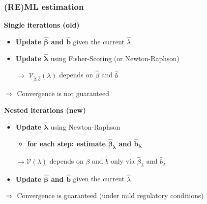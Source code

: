 \documentclass[final]{beamer}
\begin{document}





\begin{frame}
\frametitle{(RE)ML estimation}

\textcolor{beamer@postercolour}{\textbf{Single iterations (old)}}
\begin{itemize}
\item \textbf{Update  $\boldsymbol{\hat{\beta}}$ and $\boldsymbol{\hat{b}}$} given the current $\hat{\lambda}$
\item \textbf{Update $\boldsymbol{\hat{\lambda}}$} using Fisher-Scoring (or Newton-Raphson)

\vspace{0.2em}
$\rightarrow$ $\mathcal{V}_{\hat{\beta}, \hat{b}}(\lambda)$ depends on $\hat{\beta}$ and $\hat{b}$
\end{itemize}
$\Rightarrow$ Convergence is not guaranteed

\vspace{1em}
\pause

\textcolor{beamer@postercolour}{\textbf{Nested iterations (new)}}
\begin{itemize}
\item \textbf{Update $\boldsymbol{\hat{\lambda}}$} using Newton-Raphson

\begin{itemize}
\item \textbf{for each step: estimate $\boldsymbol{\hat{\beta}_\lambda}$ and $\boldsymbol{\hat{b}_\lambda}$}
\end{itemize}


$\rightarrow \mathcal{V}(\lambda)$ depends on $\beta$ and $b$ only via $\hat{\beta}_\lambda$ and $\hat{b}_\lambda$

\item \textbf{Update $\boldsymbol{\hat{\beta}}$ and $\boldsymbol{\hat{b}}$} given the current $\hat{\lambda}$

\end{itemize}
$\Rightarrow$ Convergence is guaranteed (under mild regulatory conditions)

\end{frame}
\end{document}
